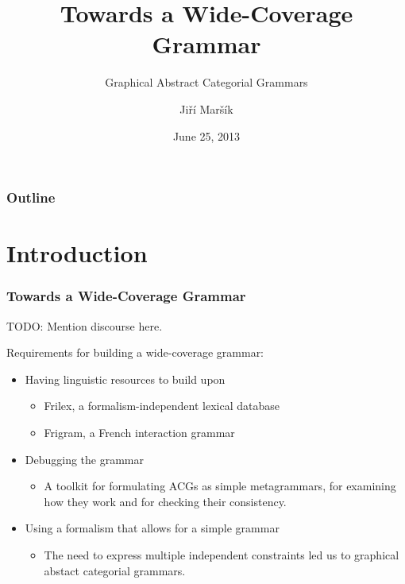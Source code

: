 \documentclass{beamer}
\begin{document}
\title[G-ACGs]{Towards a Wide-Coverage Grammar}
\subtitle{Graphical Abstract Categorial Grammars}
\author{Ji\v{r}\'{i} Mar\v{s}\'{i}k}
\date[June 2013]{June 25, 2013}

\frame{\titlepage}

\begin{frame}
\frametitle{Outline}
\tableofcontents
\end{frame}

\section{Introduction}

\begin{frame}
  \frametitle{Towards a Wide-Coverage Grammar}

TODO: Mention discourse here.

  Requirements for building a wide-coverage grammar:
    \begin{itemize}
    \item Having linguistic resources to build upon
      \begin{itemize}
      \item Frilex, a formalism-independent lexical database
      \item Frigram, a French interaction grammar
      \end{itemize}
    \item Debugging the grammar
      \begin{itemize}
        \item A toolkit for formulating ACGs as simple metagrammars, for
          examining how they work and for checking their consistency.
      \end{itemize}
    \item Using a formalism that allows for a simple grammar
      \begin{itemize}
      \item The need to express multiple independent constraints led us
        to graphical abstact categorial grammars.
      \end{itemize}
    \end{itemize}
\end{frame}
\end{document}
